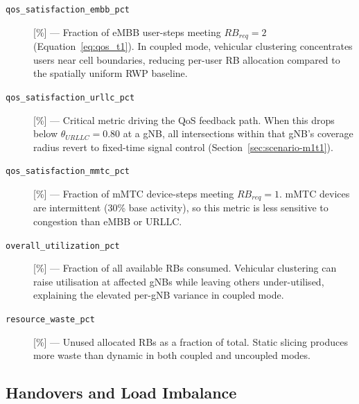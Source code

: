 \begin{description}

\item[\texttt{qos\_satisfaction\_embb\_pct}] [\%] ---
  Fraction of eMBB user-steps meeting $RB_{req} = 2$
  (Equation~\ref{eq:qos_t1}).  In coupled mode, vehicular clustering
  concentrates users near cell boundaries, reducing per-user RB allocation
  compared to the spatially uniform RWP baseline.

\item[\texttt{qos\_satisfaction\_urllc\_pct}] [\%] ---
  Critical metric driving the QoS feedback path.  When this drops below
  $\theta_{URLLC} = 0.80$ at a gNB, all intersections within that gNB's
  coverage radius revert to fixed-time signal control
  (Section~\ref{sec:scenario-m1t1}).

\item[\texttt{qos\_satisfaction\_mmtc\_pct}] [\%] ---
  Fraction of mMTC device-steps meeting $RB_{req} = 1$.  mMTC devices are
  intermittent (30\% base activity), so this metric is less sensitive to
  congestion than eMBB or URLLC.

\item[\texttt{overall\_utilization\_pct}] [\%] ---
  Fraction of all available RBs consumed.  Vehicular clustering can raise
  utilisation at affected gNBs while leaving others under-utilised, explaining
  the elevated per-gNB variance in coupled mode.

\item[\texttt{resource\_waste\_pct}] [\%] ---
  Unused allocated RBs as a fraction of total.  Static slicing produces more
  waste than dynamic in both coupled and uncoupled modes.

\end{description}

\subsection*{Handovers and Load Imbalance}

